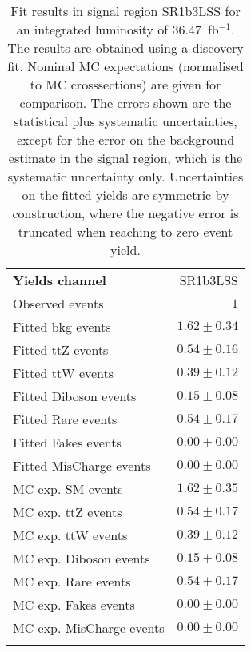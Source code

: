 

\begin{table}
\begin{center}
\setlength{\tabcolsep}{0.0pc}
{\small
\begin{tabular*}{\textwidth}{@{\extracolsep{\fill}}lr}
\noalign{\smallskip}\hline\noalign{\smallskip}
{\bfseries Yields channel}           & SR1b3LSS              \\[-0.05cm]
\noalign{\smallskip}\hline\noalign{\smallskip}
Observed events          & $1$                    \\
\noalign{\smallskip}\hline\noalign{\smallskip}
Fitted bkg events         & $1.62 \pm 0.34$              \\
\noalign{\smallskip}\hline\noalign{\smallskip}
        Fitted ttZ events         & $0.54 \pm 0.16$              \\
        Fitted ttW events         & $0.39 \pm 0.12$              \\
        Fitted Diboson events         & $0.15 \pm 0.08$              \\
        Fitted Rare events         & $0.54 \pm 0.17$              \\
        Fitted Fakes events         & $0.00 \pm 0.00$              \\
        Fitted MisCharge events         & $0.00 \pm 0.00$              \\
 \noalign{\smallskip}\hline\noalign{\smallskip}
MC exp. SM events              & $1.62 \pm 0.35$              \\
\noalign{\smallskip}\hline\noalign{\smallskip}
        MC exp. ttZ events         & $0.54 \pm 0.17$              \\
        MC exp. ttW events         & $0.39 \pm 0.12$              \\
        MC exp. Diboson events         & $0.15 \pm 0.08$              \\
        MC exp. Rare events         & $0.54 \pm 0.17$              \\
        MC exp. Fakes events         & $0.00 \pm 0.00$              \\
        MC exp. MisCharge events         & $0.00 \pm 0.00$              \\
\noalign{\smallskip}\hline\noalign{\smallskip}
\end{tabular*}
}
\end{center}
\caption{Fit results in signal region SR1b3LSS for an integrated luminosity of 36.47~fb$^{-1}$.
The results are obtained using a discovery fit. Nominal MC expectations (normalised to MC crosssections) are given for comparison. 
The errors shown are the statistical plus systematic uncertainties, except for the error on the background estimate in the signal region, which is the systematic uncertainty only.
Uncertainties on the fitted yields are symmetric by construction, where the negative error is truncated when reaching to zero event yield.
}
\label{table.results.systematics.in.logL.fit..Yields.SR1b3LSS}
\end{table}
\clearpage
%
